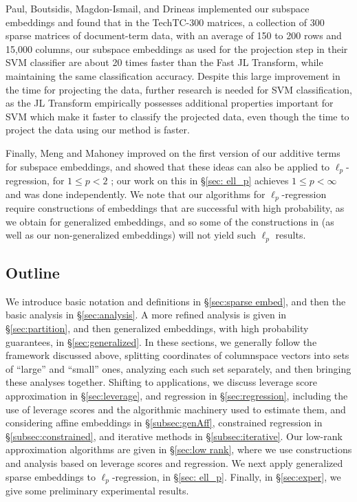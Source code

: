 \documentclass{sig-alternate}
\begin{document}
Paul, Boutsidis, Magdon-Ismail, and Drineas \cite{sbmd} implemented 
our subspace embeddings and found that
in the TechTC-300 matrices, a collection of 300 sparse matrices of document-term data, with an 
average of 150 to 200 rows and 15,000 columns, our subspace embeddings as used
for the projection step in their SVM classifier are about 20 times faster than the
Fast JL Transform, while maintaining the same classification accuracy. Despite this
large improvement in the time for projecting the data, further research is needed
for SVM classification, as the JL Transform empirically possesses additional properties important 
for SVM which make it faster to classify the projected data, 
even though the time to project the data using our method is faster. 

Finally, Meng and Mahoney improved on the first version of our additive terms for 
subspace embeddings, and
showed that these ideas can also be applied to $\ell_p$-regression, 
for $1 \leq p < 2$ \cite{MengMahoney}; our work on this in \S\ref{sec: ell_p}
achieves $1 \leq p < \infty$ and was done independently.
We note that our algorithms for $\ell_p$-regression require constructions
of embeddings that are successful with high probability, as we obtain
for generalized embeddings, and so some of the constructions in \cite{MP,NN} 
(as well as our non-generalized embeddings) will not yield such $\ell_p$ results. 



\subsection{Outline}

We introduce basic notation and definitions in \S\ref{sec:sparse embed}, and then the basic 
analysis in \S\ref{sec:analysis}. A more refined analysis is given in \S\ref{sec:partition}, and then
generalized embeddings, with high probability guarantees, in \S\ref{sec:generalized}.
In these sections, we generally follow the framework discussed above, splitting coordinates
of columnspace vectors into sets of ``large'' and ``small'' ones, analyzing each such set 
separately, and then bringing these analyses together.
Shifting to applications, we discuss leverage score approximation in
\S\ref{sec:leverage}, and regression in \S\ref{sec:regression}, including the use of leverage
scores and the algorithmic machinery used to estimate them, and considering
affine embeddings in \S\ref{subsec:genAff}, constrained regression in \S\ref{subsec:constrained},  and iterative methods 
in \S\ref{subsec:iterative}.
Our low-rank approximation algorithms are given in \S\ref{sec:low rank},
where we use constructions and analysis based on leverage
scores and regression.
We next apply generalized sparse embeddings to $\ell_p$-regression, in \S\ref{sec: ell_p}.
\ifSTOC
\else
Finally, in \S\ref{sec:exper}, we give some preliminary experimental results.
\fi
\end{document}
